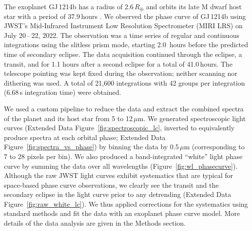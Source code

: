 \documentclass[pdflatex,sn-standardnature]{sn-jnl}%
\begin{document}
The exoplanet GJ\,1214b has a radius of 2.6\,$R_{\oplus}$ and orbits its late M dwarf host star with a period of 37.9\,hours \cite{charbonneau09}. We observed the phase curve of GJ\,1214b using JWST's Mid-Infrared Instrument Low Resolution Spectrometer (MIRI LRS) \cite{kendrew15} on July 20\,--\,22, 2022. The observation was a time series of regular and continuous integrations using the slitless prism mode, starting 2.0~hours before the predicted time of secondary eclipse.  The data acquisition continued through the eclipse, a transit, and for 1.1 hours after a second eclipse for a total of 41.0\,hours. The telescope pointing was kept fixed during the observation; neither scanning nor dithering was used. A total of 21,600 integrations with 42 groups per integration (6.68\,s integration time) were obtained. 

We used a custom pipeline to reduce the data and extract the combined spectra of the planet and its host star from 5 to 12\,$\mu$m. We generated spectroscopic light curves (Extended Data Figure~\ref{fig:spectroscopic_lc}, inverted to equivalently produce spectra at each orbital phase; Extended Data Figure~\ref{fig:spectra_vs_phase}) by binning the data by 0.5\,$\mu$m (corresponding to 7 to 28 pixels per bin). We also produced a band-integrated ``white'' light phase curve by summing the data over all wavelengths (Figure~\ref{fig:wl_phasecurve}). Although the raw JWST light curves exhibit systematics that are typical for space-based phase curve observations, we clearly see the transit and the secondary eclipse in the light curve prior to any detrending (Extended Data Figure~\ref{fig:raw_white_lc}). We thus applied corrections for the systematics using standard methods and fit the data with an exoplanet phase curve model. More details of the data analysis are given in the Methods section.
\end{document}
